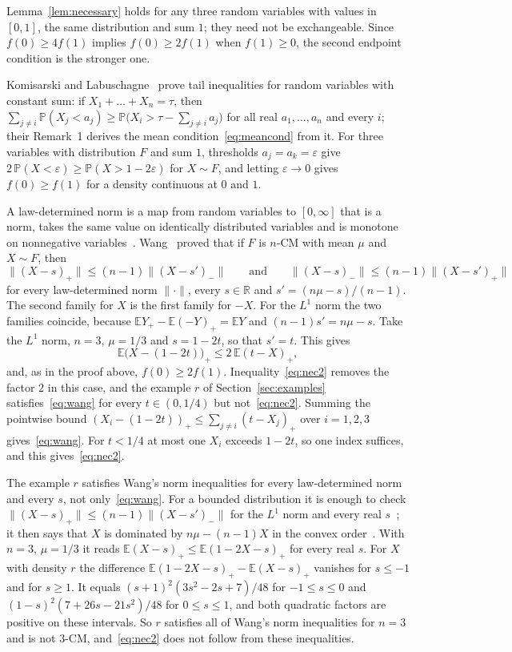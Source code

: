 \documentclass[11pt]{amsart}
\theoremstyle{remark}
\numberwithin{equation}{section}
\newcommand{\E}{\mathbb{E}}
\newcommand{\PP}{\mathbb{P}}
\begin{document}
Lemma~\ref{lem:necessary} holds for any three random variables with values
in $[0,1]$, the same distribution and sum $1$; they need not be
exchangeable. Since $f(0)\ge4f(1)$ implies
$f(0)\ge2f(1)$ when $f(1)\ge0$, the second endpoint condition is the
stronger one.

Komisarski and Labuschagne~\cite[Corollary~2]{KL24} prove tail
inequalities for random variables with constant sum: if
$X_1+\dots+X_n=\tau$, then $\sum_{j\ne i}\PP(X_j<a_j)\ge\PP\bigl(X_i>\tau-\sum_{j\ne i}a_j\bigr)$
for all real $a_1,\dots,a_n$ and every $i$; their Remark~1 derives the mean condition~\eqref{eq:meancond} from it. For three variables with
distribution $F$ and sum $1$, thresholds $a_j=a_k=\varepsilon$ give
$2\,\PP(X<\varepsilon)\ge\PP(X>1-2\varepsilon)$ for $X\sim F$, and letting $\varepsilon\to0$
gives $f(0)\ge f(1)$ for a density continuous at $0$ and $1$.

A law-determined norm is a map from random variables to $[0,\infty]$ that
is a norm, takes the same value on identically distributed variables and
is monotone on nonnegative variables~\cite[Definition~5]{Wan15}.
Wang~\cite[Theorem~5]{Wan15} proved that if $F$ is $n$-CM with mean $\mu$
and $X\sim F$, then
\[
\|(X-s)_+\|\le(n-1)\|(X-s')_-\|\qquad\text{and}\qquad
\|(X-s)_-\|\le(n-1)\|(X-s')_+\|
\]
for every law-determined norm $\|\cdot\|$, every $s\in\mathbb{R}$ and
$s'=(n\mu-s)/(n-1)$. The second family for $X$ is the first family for
$-X$. For the $L^1$ norm the two families coincide, because
$\E Y_+-\E(-Y)_+=\E Y$ and $(n-1)s'=n\mu-s$. Take the $L^1$ norm, $n=3$, $\mu=1/3$ and $s=1-2t$, so
that $s'=t$. This gives
\begin{equation}\label{eq:wang}
\E\bigl(X-(1-2t)\bigr)_+\le2\,\E(t-X)_+,
\end{equation}
and, as in the proof above, $f(0)\ge2f(1)$. Inequality~\eqref{eq:nec2}
removes the factor $2$ in this case, and the example $r$ of
Section~\ref{sec:examples} satisfies~\eqref{eq:wang} for every
$t\in(0,1/4)$ but not~\eqref{eq:nec2}. Summing the pointwise bound
$(X_i-(1-2t))_+\le\sum_{j\ne i}(t-X_j)_+$ over $i=1,2,3$
gives~\eqref{eq:wang}. For $t<1/4$ at most one $X_i$ exceeds $1-2t$, so
one index suffices, and this gives~\eqref{eq:nec2}.

The example $r$ satisfies Wang's norm inequalities for every law-determined norm
and every $s$, not only~\eqref{eq:wang}. For a bounded distribution it is enough to
check $\|(X-s)_+\|\le(n-1)\|(X-s')_-\|$ for the $L^1$ norm and every real
$s$~\cite[Proposition~3.1]{Shm26}; it then says that $X$ is dominated by
$n\mu-(n-1)X$ in the convex order~\cite[Theorem~1.3]{Shm26}. With $n=3$,
$\mu=1/3$ it reads $\E(X-s)_+\le\E(1-2X-s)_+$ for every real $s$. For $X$ with density $r$
the difference $\E(1-2X-s)_+-\E(X-s)_+$ vanishes for $s\le-1$ and for
$s\ge1$. It equals $(s+1)^2(3s^2-2s+7)/48$ for $-1\le s\le0$ and
$(1-s)^2(7+26s-21s^2)/48$ for $0\le s\le1$, and both quadratic factors are
positive on these intervals. So $r$ satisfies all of Wang's norm
inequalities for $n=3$ and is not $3$-CM, and~\eqref{eq:nec2} does not
follow from these inequalities.
\end{document}
